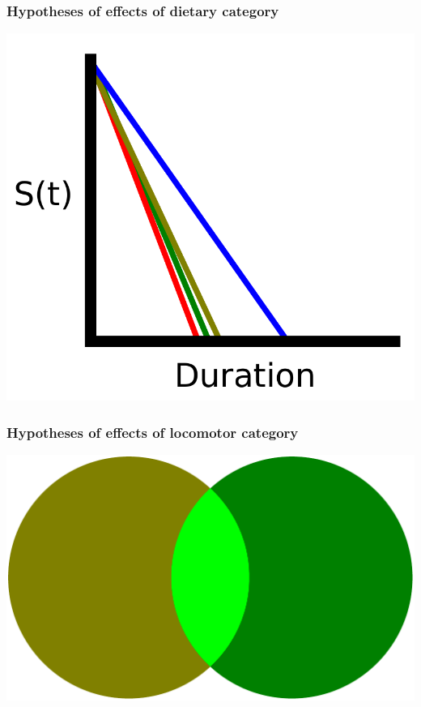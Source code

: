 \documentclass{beamer}
\begin{document}
\begin{frame}
  \frametitle{Hypotheses of effects of dietary category}
  \begin{center}
    \includegraphics[width = \textwidth,height = 0.8\textheight,keepaspectratio = true]{figure/diet_survival}
  \end{center}
\end{frame}

\begin{frame}
  \frametitle{Hypotheses of effects of locomotor category}
  \begin{center}
    \includegraphics[width = \textwidth,height = 0.8\textheight,keepaspectratio = true]{figure/loco_initial}
  \end{center}
\end{frame}
\end{document}
